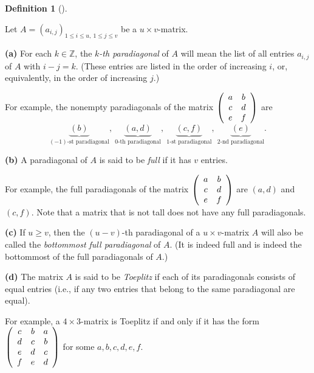\documentclass[numbers=enddot,12pt,final,onecolumn,notitlepage]{scrartcl}%
\theoremstyle{definition}
\newtheorem{defi}[theo]{Definition}
\newenvironment{definition}[1][]
{\begin{defi}[#1]\begin{leftbar}}
{\end{leftbar}\end{defi}}
\renewcommand{\leq}{\leqslant}
\renewcommand{\geq}{\geqslant}
\theoremstyle{plainsl}
\begin{document}
\begin{definition}
Let $A=\left(  a_{i,j}\right)  _{1\leq i\leq u,\ 1\leq j\leq v}$ be a $u\times
v$-matrix.

\textbf{(a)} For each $k\in\mathbb{Z}$, the $k$\emph{-th paradiagonal} of $A$
will mean the list of all entries $a_{i,j}$ of $A$ with $i-j=k$. (These
entries are listed in the order of increasing $i$, or, equivalently, in the
order of increasing $j$.)

For example, the nonempty paradiagonals of the matrix $\left(
\begin{array}
[c]{cc}%
a & b\\
c & d\\
e & f
\end{array}
\right)  $ are%
\[
\underbrace{\left(  b\right)  }_{\left(  -1\right)  \text{-st paradiagonal}%
},\ \underbrace{\left(  a,d\right)  }_{0\text{-th paradiagonal}}%
,\ \underbrace{\left(  c,f\right)  }_{1\text{-st paradiagonal}}%
,\ \underbrace{\left(  e\right)  }_{2\text{-nd paradiagonal}}.
\]


\textbf{(b)} A paradiagonal of $A$ is said to be \emph{full} if it has $v$ entries.

For example, the full paradiagonals of the matrix $\left(
\begin{array}
[c]{cc}%
a & b\\
c & d\\
e & f
\end{array}
\right)  $ are $\left(  a,d\right)  $ and $\left(  c,f\right)  $. Note that a
matrix that is not tall does not have any full paradiagonals.

\textbf{(c)} If $u\geq v$, then the $\left(  u-v\right)  $-th paradiagonal of
a $u\times v$-matrix $A$ will also be called the \emph{bottommost full
paradiagonal} of $A$. (It is indeed full and is indeed the bottommost of the
full paradiagonals of $A$.)

\textbf{(d)} The matrix $A$ is said to be \emph{Toeplitz} if each of its
paradiagonals consists of equal entries (i.e., if any two entries that belong
to the same paradiagonal are equal).

For example, a $4\times3$-matrix is Toeplitz if and only if it has the form
$\left(
\begin{array}
[c]{ccc}%
c & b & a\\
d & c & b\\
e & d & c\\
f & e & d
\end{array}
\right)  $ for some $a,b,c,d,e,f$.


\end{definition}
\end{document}
